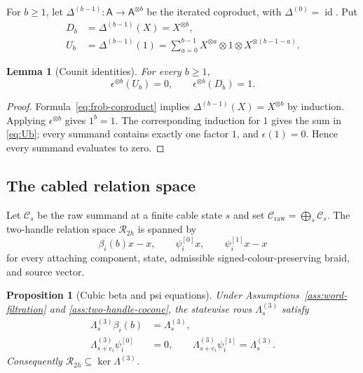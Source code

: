 \documentclass[10pt,reqno]{amsart}
\newtheorem{proposition}[theorem]{Proposition}
\newtheorem{lemma}[theorem]{Lemma}
\theoremstyle{definition}
\theoremstyle{remark}
\newcommand{\id}{\operatorname{id}}
\begin{document}
For $b\ge1$, let $\Delta^{(b-1)}:\mathsf A\to\mathsf A^{\otimes b}$ be the
iterated coproduct, with $\Delta^{(0)}=\id$.  Put
\begin{align}
D_b&=\Delta^{(b-1)}(X)=X^{\otimes b}, \label{eq:Db}\\
U_b&=\Delta^{(b-1)}(1)
=\sum_{a=0}^{b-1}X^{\otimes a}\otimes1\otimes
X^{\otimes(b-1-a)}. \label{eq:Ub}
\end{align}

\begin{lemma}[Counit identities]\label{lem:counit-identities}
For every $b\ge1$,
\begin{equation}\label{eq:counit-identities}
\epsilon^{\otimes b}(U_b)=0,
\qquad
\epsilon^{\otimes b}(D_b)=1.
\end{equation}
\end{lemma}

\begin{proof}
Formula~\eqref{eq:frob-coproduct} implies
$\Delta^{(b-1)}(X)=X^{\otimes b}$ by induction.  Applying
$\epsilon^{\otimes b}$ gives $1^b=1$.  The corresponding induction for $1$
gives the sum in \cref{eq:Ub}; every summand contains exactly one factor
$1$, and $\epsilon(1)=0$.  Hence every summand evaluates to zero.
\end{proof}

\subsection{The cabled relation space}

Let $\mathcal C_s$ be the raw summand at a finite cable state $s$ and set
$\mathcal C_{\mathrm{raw}}=\bigoplus_s\mathcal C_s$.  The two-handle relation
space $\mathcal R_{2h}$ is spanned by
\begin{equation}\label{eq:two-handle-generators}
\beta_i(b)x-x,\qquad \psi_i^{[0]}x,\qquad
\psi_i^{[1]}x-x
\end{equation}
for every attaching component, state, admissible signed-colour-preserving braid, and source
vector.

\begin{proposition}[Cubic beta and psi equations]\label{prop:beta-psi}
Under Assumptions~\ref{ass:word-filtration} and
\ref{ass:two-handle-cocone}, the statewise rows $\Lambda_s^{(3)}$ satisfy
\begin{align}
\Lambda_s^{(3)}\beta_i(b)&=\Lambda_s^{(3)},
\label{eq:beta-cocone}\\
\Lambda_{s+e_i}^{(3)}\psi_i^{[0]}&=0,
\qquad
\Lambda_{s+e_i}^{(3)}\psi_i^{[1]}=\Lambda_s^{(3)}.
\label{eq:psi-cocone}
\end{align}
Consequently $\mathcal R_{2h}\subseteq\ker\Lambda^{(3)}$.
\end{proposition}
\end{document}

